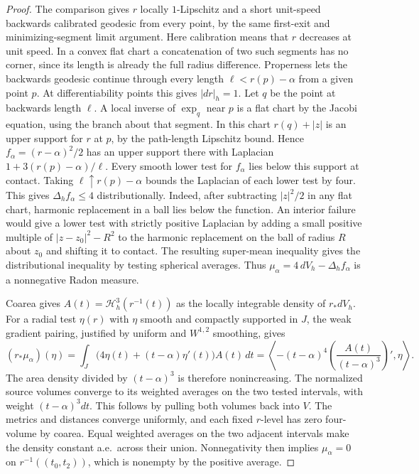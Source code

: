 \begin{proof}
The comparison gives \(r\) locally \(1\)-Lipschitz and a short
unit-speed backwards calibrated geodesic from every point,
by the same first-exit and minimizing-segment limit argument.
Here calibration means that \(r\) decreases at unit speed.
In a convex flat chart a concatenation of two such segments
has no corner, since its length is already the full radius
difference. Properness lets the backwards geodesic continue
through every length \(\ell<r(p)-\alpha\) from a given point
\(p\). At differentiability points this gives \(|dr|_h=1\).
Let \(q\) be the point at backwards length \(\ell\).
A local inverse of \(\exp_q\) near \(p\) is a flat chart by
the Jacobi equation, using the branch about that segment.
In this chart \(r(q)+|z|\) is an upper support for \(r\)
at \(p\), by the path-length Lipschitz bound. Hence
\(f_\alpha=(r-\alpha)^2/2\) has an upper support there with
Laplacian \(1+3(r(p)-\alpha)/\ell\).
Every smooth lower test for \(f_\alpha\) lies below this
support at contact. Taking \(\ell\uparrow r(p)-\alpha\)
bounds the Laplacian of each lower test by four.
This gives \(\Delta_h f_\alpha\le4\) distributionally.
Indeed, after subtracting \(|z|^2/2\) in any flat chart,
harmonic replacement in a ball lies below the function.
An interior failure would give a lower test with
strictly positive Laplacian by adding a small positive
multiple of \(|z-z_0|^2-R^2\) to the harmonic replacement
on the ball of radius \(R\) about \(z_0\) and shifting
it to contact. The resulting super-mean inequality gives
the distributional inequality by testing spherical averages.
Thus \(\mu_\alpha=4\,dV_h-\Delta_h f_\alpha\) is a
nonnegative Radon measure.

Coarea gives \(A(t)=\mathcal H_h^3(r^{-1}(t))\) as the
locally integrable density of \(r_*dV_h\).
For a radial test \(\eta(r)\) with \(\eta\) smooth and
compactly supported in \(J\), the weak gradient pairing,
justified by uniform and \(W^{1,2}\) smoothing, gives
\[
 (r_*\mu_\alpha)(\eta)
 =\int_J \bigl(4\eta(t)+(t-\alpha)\eta'(t)\bigr)A(t)\,dt
 =\left\langle -(t-\alpha)^4
        \left(\frac{A(t)}{(t-\alpha)^3}\right)',\eta\right\rangle .
\]
The area density divided by \((t-\alpha)^3\) is therefore
nonincreasing. The normalized source volumes converge to its
weighted averages on the two tested intervals, with weight
\((t-\alpha)^3dt\). This follows by pulling both volumes
back into \(V\). The metrics and distances converge uniformly,
and each fixed \(r\)-level has zero four-volume by coarea.
Equal weighted averages on the two adjacent intervals make
the density constant a.e.\ across their union.
Nonnegativity then implies \(\mu_\alpha=0\) on
\(r^{-1}((t_0,t_2))\), which is nonempty by the positive
average.


\end{proof}
